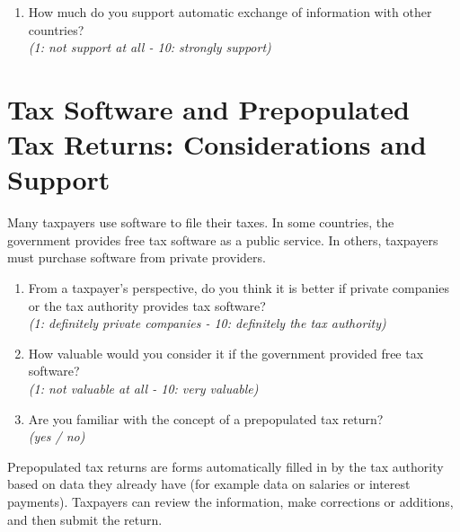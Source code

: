 \documentclass[11pt]{article}
\begin{document}
\begin{enumerate}[resume]
    \item How much do you support automatic exchange of information with other countries? \\
    \textit{(1: not support at all - 10: strongly support)}
\end{enumerate}
\section*{Tax Software and Prepopulated Tax Returns: Considerations and Support} 
\noindent Many taxpayers use software to file their taxes. In some countries, the government provides free tax software as a public service. In others, taxpayers must purchase software from private providers.\\
\begin{enumerate}[resume]
    \item From a taxpayer’s perspective, do you think it is better if private companies or the tax authority provides tax software? \\
    \textit{(1: definitely private companies - 10: definitely the tax authority)}
    \item How valuable would you consider it if the government provided free tax software?\\
    \textit{(1: not valuable at all - 10: very valuable)}
    \item Are you familiar with the concept of a prepopulated tax return?\\
    \textit{(yes / no)}
\end{enumerate}

\vspace{0.5em}
\noindent Prepopulated tax returns are forms automatically filled in by the tax authority  based on data they already have (for example data on salaries or interest payments). Taxpayers can review the information, make corrections or additions, and then submit the return.
\end{document}
